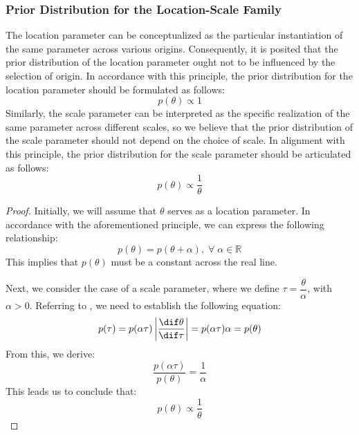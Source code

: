 \subsubsection{Prior Distribution for the Location-Scale Family}
\begin{theorem}
	The location parameter can be conceptualized as the particular instantiation of the same parameter across various origins. Consequently, it is posited that the prior distribution of the location parameter ought not to be influenced by the selection of origin. In accordance with this principle, the prior distribution for the location parameter should be formulated as follows: 
	\begin{equation*}
		p(\theta)\propto1
	\end{equation*}
	Similarly, the scale parameter can be interpreted as the specific realization of the same parameter across different scales, so we believe that the prior distribution of the scale parameter should not depend on the choice of scale. In alignment with this principle, the prior distribution for the scale parameter should be articulated as follows:
	\begin{equation*}
		p(\theta)\propto\frac{1}{\theta}
	\end{equation*}
\end{theorem}
\begin{proof}
	Initially, we will assume that $\theta$ serves as a location parameter. In accordance with the aforementioned principle, we can express the following relationship:
	\begin{equation*}
		p(\theta) = p(\theta + \alpha), \;\forall\; \alpha \in \mathbb{R}^{}
	\end{equation*}
	This implies that $p(\theta)$ must be a constant across the real line. 
	
	Next, we consider the case of a scale parameter, where we define $\tau = \dfrac{\theta}{\alpha}$, with $\alpha > 0$. Referring to , we need to establish the following equation:
	\begin{equation*}
		p(\tau) = p(\alpha \tau) \left| \frac{\dif \theta}{\dif\tau} \right| = p(\alpha \tau) \alpha = p(\theta)
	\end{equation*}
	From this, we derive:
	\begin{equation*}
		\frac{p(\alpha \tau)}{p(\theta)} = \frac{1}{\alpha}
	\end{equation*}
	This leads us to conclude that:
	\begin{equation*}
		p(\theta) \propto \frac{1}{\theta}
	\end{equation*}
\end{proof}

